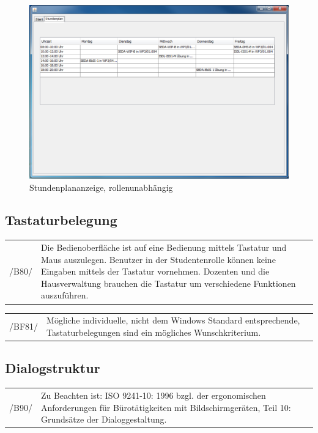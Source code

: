 \begin{figure}[H]
\begin{center}
\includegraphics[width=170mm]{images/section_7/HauptseiteAlleStundenplan.PNG}
\caption{Stundenplananzeige, rollenunabhängig}
\label{img:stundenplanAlle}
\end{center}
\end{figure}
 
\subsection{Tastaturbelegung}

\begin{tabular}{p{1.5cm}p{14.5cm}}
 /B80/	& Die Bedienoberfläche ist auf eine Bedienung mittels Tastatur und Maus auszulegen. Benutzer in der Studentenrolle können keine Eingaben mittels der Tastatur vornehmen. Dozenten und die Hausverwaltung brauchen die Tastatur um verschiedene Funktionen auszuführen. \\[0.25cm]	 
\end{tabular}

\begin{tabular}{p{1.5cm}p{14.5cm}}
 /BF81/	& Mögliche individuelle, nicht dem Windows Standard entsprechende, Tastaturbelegungen sind ein mögliches  Wunschkriterium. \\[0.25cm]	 
\end{tabular}


\subsection{Dialogstruktur}

\begin{tabular}{p{1.5cm}p{14.5cm}}
 /B90/	& Zu Beachten ist: ISO 9241-10: 1996 bzgl. der ergonomischen Anforderungen für Bürotätigkeiten mit Bildschirmgeräten, Teil 10: Grundsätze der Dialoggestaltung. \\[0.25cm]	 
\end{tabular}

